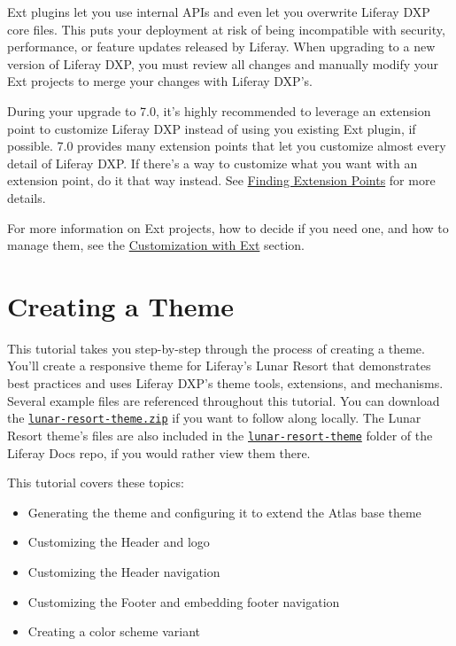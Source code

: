 Ext plugins let you use internal APIs and even let you overwrite Liferay
DXP core files. This puts your deployment at risk of being incompatible
with security, performance, or feature updates released by Liferay. When
upgrading to a new version of Liferay DXP, you must review all changes
and manually modify your Ext projects to merge your changes with Liferay
DXP's.

During your upgrade to 7.0, it's highly recommended to leverage an
extension point to customize Liferay DXP instead of using you existing
Ext plugin, if possible. 7.0 provides many extension points that let you
customize almost every detail of Liferay DXP. If there's a way to
customize what you want with an extension point, do it that way instead.
See
\href{/docs/7-2/customization/-/knowledge_base/c/finding-extension-points}{Finding
Extension Points} for more details.

For more information on Ext projects, how to decide if you need one, and
how to manage them, see the
\href{/docs/7-2/customization/-/knowledge_base/c/customization-with-ext}{Customization
with Ext} section.

\chapter{Creating a Theme}\label{creating-a-theme}

This tutorial takes you step-by-step through the process of creating a
theme. You'll create a responsive theme for Liferay's Lunar Resort that
demonstrates best practices and uses Liferay DXP's theme tools,
extensions, and mechanisms. Several example files are referenced
throughout this tutorial. You can download the
\href{https://github.com/liferay/liferay-docs/tree/master/en/developer/tutorials/code}{\texttt{lunar-resort-theme.zip}}
if you want to follow along locally. The Lunar Resort theme's files are
also included in the
\href{https://github.com/liferay/liferay-docs/tree/master/en/developer/tutorials/code/lunar-resort-theme}{\texttt{lunar-resort-theme}}
folder of the Liferay Docs repo, if you would rather view them there.

This tutorial covers these topics:

\begin{itemize}
\tightlist
\item
  Generating the theme and configuring it to extend the Atlas base theme
\item
  Customizing the Header and logo
\item
  Customizing the Header navigation
\item
  Customizing the Footer and embedding footer navigation
\item
  Creating a color scheme variant
\end{itemize}

